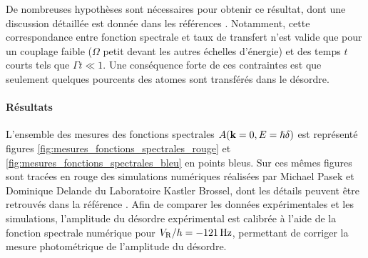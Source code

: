 De nombreuses hypothèses sont nécessaires pour obtenir ce résultat, dont une discussion détaillée est donnée dans les références \citep{denechaud2018vers}\citep{volchkov2018measurement}. Notamment, cette correspondance entre fonction spectrale et taux de transfert n'est valide que pour un couplage faible ($\Omega$ petit devant les autres échelles d'énergie) et des temps $t$ courts tels que $\Gamma t \ll 1$. Une conséquence forte de ces contraintes est que seulement quelques pourcents des atomes sont transférés dans le désordre. 



\paragraph*{Résultats}
L'ensemble des mesures des fonctions spectrales $A(\mathbf{k}=0,E=\hslash\delta)$ est représenté figures \ref{fig:mesures_fonctions_spectrales_rouge} et \ref{fig:mesures_fonctions_spectrales_bleu} en points bleus. Sur ces mêmes figures sont tracées en rouge des simulations numériques réalisées par Michael Pasek et Dominique Delande du Laboratoire Kastler Brossel, dont les détails peuvent être retrouvés dans la référence \citep{volchkov2018measurement}. Afin de comparer les données expérimentales et les simulations, l'amplitude du désordre expérimental est calibrée à l'aide de la fonction spectrale numérique pour $V_{\mathrm{R}}/h=\SI{-121}{\hertz}$, permettant de corriger la mesure photométrique de l'amplitude du désordre. 

